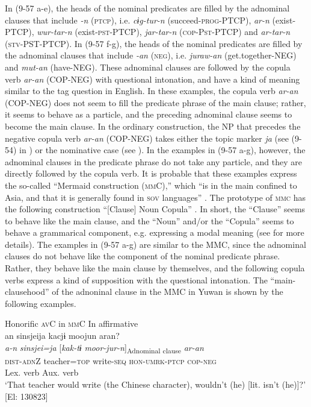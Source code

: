 In (9-57 a-e), the heads of the nominal predicates are filled by the adnominal clauses that include \textit{-n} (\textsc{ptcp}), i.e. \textit{cɨg-tur-n} (succeed-\textsc{prog}-PTCP), \textit{ar-n} (exist-PTCP), \textit{wur-tar-n} (exist-\textsc{pst}-PTCP), \textit{jar-tar-n} (\textsc{cop}-P\textsc{st}-PTCP) and \textit{ar-tar-n} (\textsc{stv}-PST-PTCP). In (9-57 f-g), the heads of the nominal predicates are filled by the adnominal clauses that include \textit{-an} (\textsc{neg}), i.e. \textit{juraw-an} (get.together-NEG) and \textit{mut-an} (have-NEG). These adnominal clauses are followed by the copula verb \textit{ar-an} (COP-NEG) with questional intonation, and have a kind of meaning similar to the tag question in English. In these examples, the copula verb \textit{ar-an} (COP-NEG) does not seem to fill the predicate phrase of the main clause; rather, it seems to behave as a particle, and the preceding adnominal clause seems to become the main clause. In the ordinary construction, the NP that precedes the negative copula verb \textit{ar-an} (COP-NEG) takes either the topic marker \textit{ja} (see (9-54) in ) or the nominative case (see ). In the examples in (9-57 a-g), however, the adnominal clauses in the predicate phrase do not take any particle, and they are directly followed by the copula verb. It is probable that these examples express the so-called “Mermaid construction (\textsc{mm}C),” which “is in the main confined to Asia, and that it is generally found in \textsc{sov} languages” \citep[25]{Tsunoda2013}. The prototype of \textsc{mmc} has the following construction “[Clause] Noun Copula” \citep[16]{Tsunoda2013}. In short, the “Clause” seems to behave like the main clause, and the “Noun” and/or the “Copula” seems to behave a grammarical component, e.g. expressing a modal meaning (see \citealt{Tsunoda2013} for more details). The examples in (9-57 a-g) are similar to the MMC, since the adnominal clauses do not behave like the component of the nominal predicate phrase. Rather, they behave like the main clause by themselves, and the following copula verbs express a kind of supposition with the questional intonation. The “main-clausehood” of the adnoninal clause in the MMC in Yuwan is shown by the following examples.

\ea   Honorific \textsc{av}C in \textsc{mm}C \label{ex:9.58}
\ea In affirmative\\
 \gllll  an  sinsjeija  kacjɨ  moojun  aran?\\
    \textit{a-n}  \textit{sinsjei=ja}  [\textit{kak-tɨ}  \textit{moor-jur-n}]\textsubscript{Adnominal clause}  \textit{ar-an}\\
    \textsc{dist}-\textsc{adn}Z  teacher=\textsc{top}  write-\textsc{seq}  \textsc{hon}-\textsc{umrk}-\textsc{ptcp}  \textsc{cop}-\textsc{neg}\\
        Lex. verb  Aux. verb\\
    \glt     ‘That teacher would write (the Chinese character), wouldn’t (he) [lit. isn’t (he)]?’ [El: 130823]

